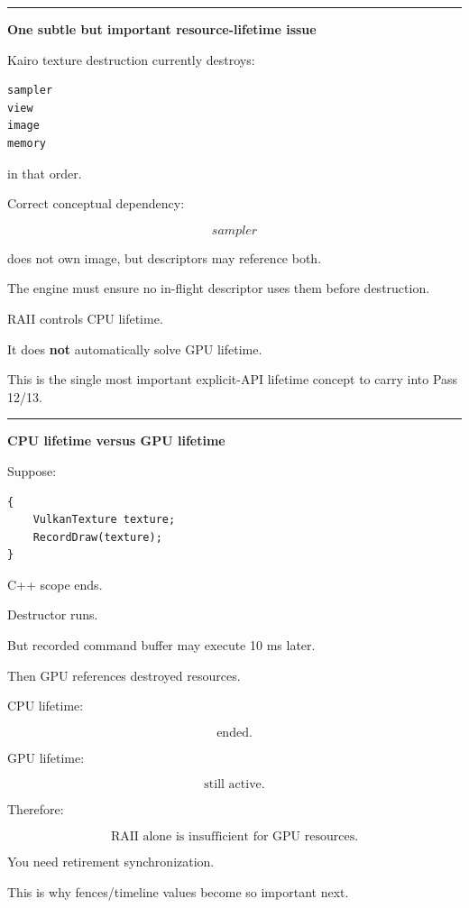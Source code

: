 \begin{center}\rule{0.5\linewidth}{0.5pt}\end{center}

\textbf{One subtle but important resource-lifetime issue}

Kairo texture destruction currently destroys:

\begin{verbatim}
sampler
view
image
memory
\end{verbatim}

in that order.

Correct conceptual dependency:

\[
sampler
\]

does not own image, but descriptors may reference both.

The engine must ensure no in-flight descriptor uses them before destruction.

RAII controls CPU lifetime.

It does \textbf{not} automatically solve GPU lifetime.

This is the single most important explicit-API lifetime concept to carry into Pass 12/13.

\begin{center}\rule{0.5\linewidth}{0.5pt}\end{center}

\textbf{CPU lifetime versus GPU lifetime}

Suppose:

\begin{verbatim}
{
    VulkanTexture texture;
    RecordDraw(texture);
}
\end{verbatim}

C++ scope ends.

Destructor runs.

But recorded command buffer may execute 10 ms later.

Then GPU references destroyed resources.

CPU lifetime:

\[
\text{ended}.
\]

GPU lifetime:

\[
\text{still active}.
\]

Therefore:

\[
\boxed{
\text{RAII alone is insufficient for GPU resources}.
}
\]

You need retirement synchronization.

This is why fences/timeline values become so important next.

